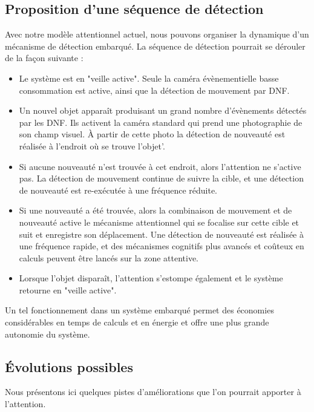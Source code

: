 	\subsection{Proposition d'une séquence de détection}

	Avec notre modèle attentionnel actuel, nous pouvons organiser la dynamique d'un mécanisme de détection embarqué. La séquence de détection pourrait se dérouler de la façon suivante : 

	\begin{itemize}
		\item Le système est en "veille active". Seule la caméra évènementielle basse consommation est active, ainsi que la détection de mouvement par DNF.
		\item Un nouvel objet apparaît produisant un grand nombre d'évènements détectés par les DNF. Ils activent la caméra standard qui prend une photographie de son champ visuel. À partir de cette photo la détection de nouveauté est réalisée à l'endroit où se trouve l'objet'.
		\item Si aucune nouveauté n'est trouvée à cet endroit, alors l'attention ne s'active pas. La détection de mouvement continue de suivre la cible, et une détection de nouveauté est re-exécutée à une fréquence réduite.
		\item Si une nouveauté a été trouvée, alors la combinaison de mouvement et de nouveauté active le mécanisme attentionnel qui se focalise sur cette cible et suit et enregistre son déplacement. Une détection de nouveauté est réalisée à une fréquence rapide, et des mécanismes cognitifs plus avancés et coûteux en calculs peuvent être lancés sur la zone attentive.
		\item Lorsque l'objet disparaît, l'attention s'estompe également et le système retourne en "veille active".
	\end{itemize}

	Un tel fonctionnement dans un système embarqué permet des économies considérables en temps de calculs et en énergie et offre une plus grande autonomie du système.

	\subsection{Évolutions possibles}

	Nous présentons ici quelques pistes d'améliorations que l'on pourrait apporter à l'attention.


